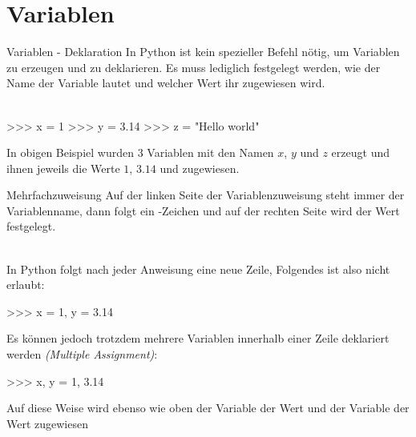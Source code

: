 \newcommand{\decktitle}{Python II - Grundlagen}

%
%


		
        
    \section{Variablen}
    
        \begin{frame}[fragile]{Variablen - Deklaration}
            In Python ist kein spezieller Befehl nötig, um Variablen zu erzeugen und zu deklarieren. Es muss lediglich festgelegt werden, wie der Name der Variable lautet und welcher Wert ihr zugewiesen wird. \\~\

\begin{pyconcode}
>>> x = 1
>>> y = 3.14
>>> z = "Hello world"
\end{pyconcode}
    
            In obigen Beispiel wurden 3 Variablen mit den Namen $x$, $y$ und $z$ erzeugt und ihnen jeweils die Werte $1$, $3.14$ und  zugewiesen.
            
        \end{frame}
        
        \begin{frame}[fragile]{Mehrfachzuweisung}
            Auf der linken Seite der Variablenzuweisung steht immer der Variablenname, dann folgt ein \code{=}-Zeichen und auf der rechten Seite wird der Wert festgelegt. \\~\
            
            In Python folgt nach jeder Anweisung eine neue Zeile, Folgendes ist also nicht erlaubt: 
\begin{pyconcode}
>>> x = 1, y = 3.14
\end{pyconcode}

            Es können jedoch trotzdem mehrere Variablen innerhalb einer Zeile deklariert werden \textit{(Multiple Assignment)}:
\begin{pyconcode}
>>> x, y = 1, 3.14
\end{pyconcode}
            
            Auf diese Weise wird ebenso wie oben der Variable  der Wert  und der Variable  der Wert  zugewiesen
            
        \end{frame}
        

